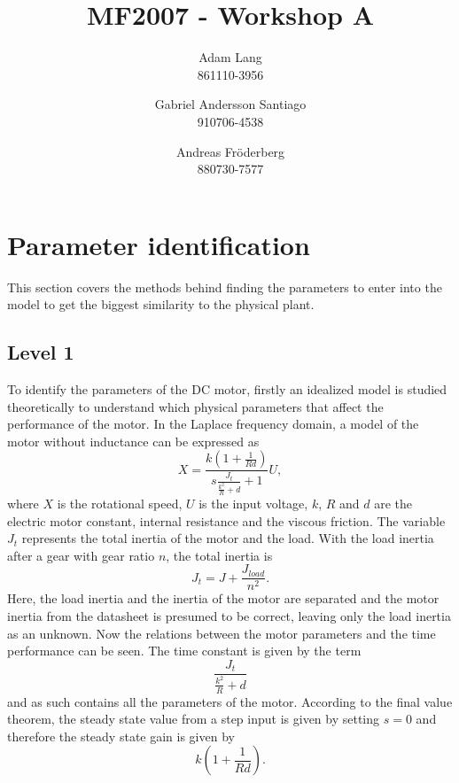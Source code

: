 \documentclass[12pt,a4paper]{article}
\title{MF2007 - Workshop A}
\author{
Adam Lang \\ 861110-3956
\and
Gabriel Andersson Santiago \\ 910706-4538
\and 
Andreas Fr\"oderberg \\ 880730-7577
}
\begin{document}
\maketitle

\section*{Parameter identification}
This section covers the methods behind finding the parameters to enter into the
model to get the biggest similarity to the physical plant.

\subsection*{Level 1}
To identify the parameters of the DC motor, firstly an idealized model is
studied theoretically to understand which physical parameters that affect the
performance of the motor. In the Laplace frequency domain, a model of the motor
without inductance can be expressed as 
\begin{equation}
    \label{eq:motormodel}
    X = \frac {k (1 + \frac{1}{Rd})} {s \frac {J_t} { \frac {k^2} {R} + d} + 1}
    U,
\end{equation}
where $X$ is the rotational speed, $U$ is the input voltage, $k$, $R$ and $d$
are the electric motor constant, internal resistance and the viscous friction.
The variable $J_t$ represents the total inertia of the motor and the load. With
the load inertia after a gear with gear ratio $n$, the total inertia is
\begin{equation}
    \label{eq:inertia}
    J_t = J + \frac{J_{load}}{n^2}.
\end{equation}
Here, the load inertia and the inertia of the motor are separated and the motor
inertia from the datasheet is presumed to be correct, leaving only the load
inertia as an unknown.  Now the relations between the motor parameters and the
time performance can be seen. The time constant is given by the term
\begin{equation*}
    \label{eq:timeconstant}
    \frac {J_t} { \frac {k^2} {R} + d}
\end{equation*}
and as such contains all the parameters of the motor. According to the final
value theorem, the steady state value from a step input is given by setting
$s=0$ and therefore the steady state gain is given by 
\begin{equation*}
    \label{eq:steadystate}
    k (1 + \frac{1}{Rd}).
\end{equation*}
\end{document}
